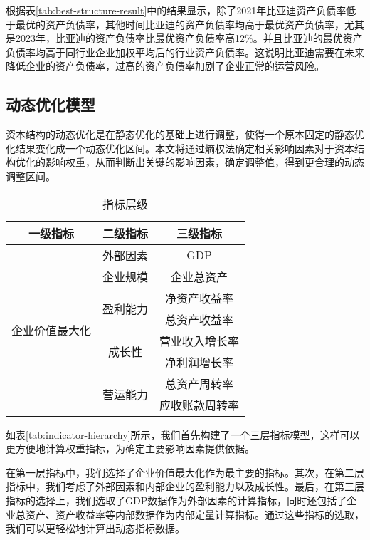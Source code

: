 根据表\eqref{tab:best-structure-result}中的结果显示，除了2021年比亚迪资产负债率低于最优的资产负债率，其他时间比亚迪的资产负债率均高于最优资产负债率，尤其是2023年，比亚迪的资产负债率比最优资产负债率高12\%。并且比亚迪的最优资产负债率均高于同行业企业加权平均后的行业资产负债率。这说明比亚迪需要在未来降低企业的资产负债率，过高的资产负债率加剧了企业正常的运营风险。
\subsection{动态优化模型}
资本结构的动态优化是在静态优化的基础上进行调整，使得一个原本固定的静态优化结果变化成一个动态优化区间。本文将通过熵权法确定相关影响因素对于资本结构优化的影响权重，从而判断出关键的影响因素，确定调整值，得到更合理的动态调整区间。
\begin{table}
  \centering
  \begin{threeparttable}[c]
    \caption{指标层级}
    \label{tab:indicator-hierarchy}
    \begin{tabular}{ccc}
      \toprule
        一级指标 & 二级指标 & 三级指标 \\ 
      \midrule
        \multirow{9}{*}{企业价值最大化} & 外部因素 & GDP \\ 
                                    & 企业规模 & 企业总资产 \\ 
                        & \multirow{2}{*}{盈利能力} & 净资产收益率 \\ 
                        &                          & 总资产收益率 \\
                        & \multirow{2}{*}{成长性} & 营业收入增长率 \\ 
                        &                         & 净利润增长率 \\
                        & \multirow{2}{*}{营运能力} & 总资产周转率 \\ 
                        &                          & 应收账款周转率 \\
      \bottomrule
    \end{tabular}
  \end{threeparttable}
\end{table}

如表\eqref{tab:indicator-hierarchy}所示，我们首先构建了一个三层指标模型，这样可以更方便地计算权重指标，为确定主要影响因素提供依据。

在第一层指标中，我们选择了企业价值最大化作为最主要的指标。其次，在第二层指标中，我们考虑了外部因素和内部企业的盈利能力以及成长性。最后，在第三层指标的选择上，我们选取了GDP数据作为外部因素的计算指标，同时还包括了企业总资产、资产收益率等内部数据作为内部定量计算指标。通过这些指标的选取，我们可以更轻松地计算出动态指标数据。

